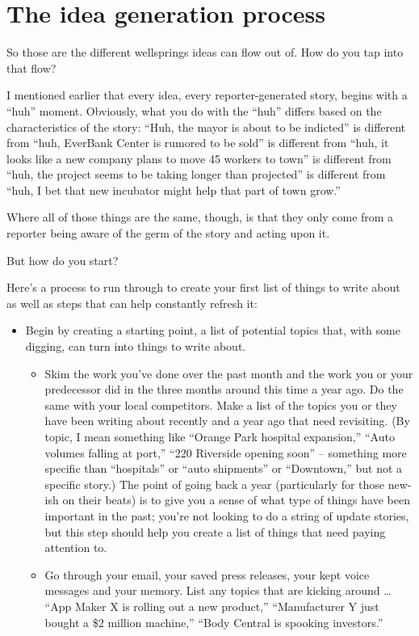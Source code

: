 \documentclass[
  12pt,
  american,
  letterpaperpaper,
  extrafontsizes,onecolumn,openright
  ]{memoir}
\providecommand{\tightlist}{%
  \setlength{\itemsep}{0pt}\setlength{\parskip}{0pt}}
\begin{document}
\hypertarget{the-idea-generation-process}{%
\section*{The idea generation process}\label{the-idea-generation-process}}

So those are the different wellsprings ideas can flow out of. How do you tap into that flow?

I mentioned earlier that every idea, every reporter-generated story, begins with a \enquote{huh} moment. Obviously, what you do with the \enquote{huh} differs based on the characteristics of the story: \enquote{Huh, the mayor is about to be indicted} is different from \enquote{huh, EverBank Center is rumored to be sold} is different from \enquote{huh, it looks like a new company plans to move 45 workers to town} is different from \enquote{huh, the project seems to be taking longer than projected} is different from \enquote{huh, I bet that new incubator might help that part of town grow.}

Where all of those things are the same, though, is that they only come from a reporter being aware of the germ of the story and acting upon it.

But how do you start?

Here's a process to run through to create your first list of things to write about as well as steps that can help constantly refresh it:

\begin{itemize}
\tightlist
\item
  Begin by creating a starting point, a list of potential topics that, with some digging, can turn into things to write about.

  \begin{itemize}
  \tightlist
  \item
    Skim the work you've done over the past month and the work you or your predecessor did in the three months around this time a year ago. Do the same with your local competitors. Make a list of the topics you or they have been writing about recently and a year ago that need revisiting. (By topic, I mean something like \enquote{Orange Park hospital expansion,} \enquote{Auto volumes falling at port,} \enquote{220 Riverside opening soon} -- something more specific than \enquote{hospitals} or \enquote{auto shipments} or \enquote{Downtown,} but not a specific story.) The point of going back a year (particularly for those new-ish on their beats) is to give you a sense of what type of things have been important in the past; you're not looking to do a string of update stories, but this step should help you create a list of things that need paying attention to.
  \item
    Go through your email, your saved press releases, your kept voice messages and your memory. List any topics that are kicking around \ldots{} \enquote{App Maker X is rolling out a new product,} \enquote{Manufacturer Y just bought a \$2 million machine,} \enquote{Body Central is spooking investors.}
  \end{itemize}
\end{itemize}
\end{document}
